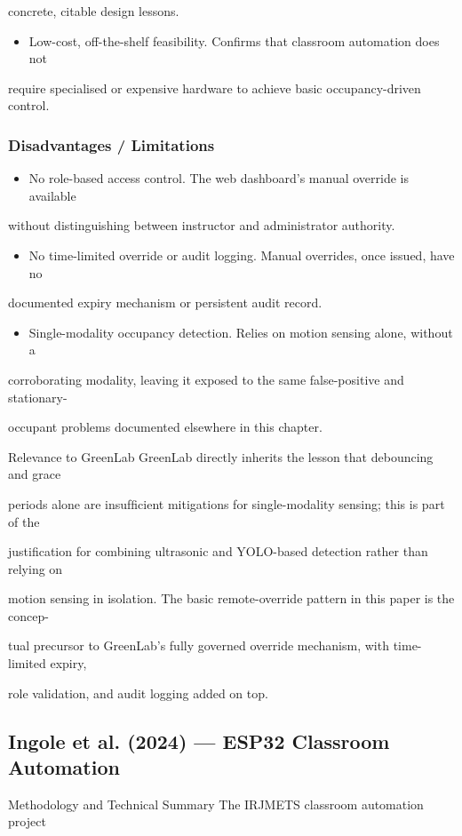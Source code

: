 concrete, citable design lessons.

\begin{itemize}
	\item Low-cost, off-the-shelf feasibility. Conﬁrms that classroom automation does not
\end{itemize}
require specialised or expensive hardware to achieve basic occupancy-driven control.


\subsubsection*{Disadvantages / Limitations}
\begin{itemize}
	\item No role-based access control. The web dashboard's manual override is available
\end{itemize}
without distinguishing between instructor and administrator authority.

\begin{itemize}
	\item No time-limited override or audit logging. Manual overrides, once issued, have no
\end{itemize}
documented expiry mechanism or persistent audit record.

\begin{itemize}
	\item Single-modality occupancy detection. Relies on motion sensing alone, without a
\end{itemize}
corroborating modality, leaving it exposed to the same false-positive and stationary-

occupant problems documented elsewhere in this chapter.

Relevance to GreenLab GreenLab directly inherits the lesson that debouncing and grace

periods alone are insufﬁcient mitigations for single-modality sensing; this is part of the

justiﬁcation for combining ultrasonic and YOLO-based detection rather than relying on

motion sensing in isolation. The basic remote-override pattern in this paper is the concep-

tual precursor to GreenLab's fully governed override mechanism, with time-limited expiry,

role validation, and audit logging added on top.


\subsection{Ingole et al. (2024) --- ESP32 Classroom Automation}
Methodology and Technical Summary The IRJMETS classroom automation project

